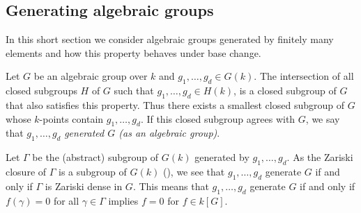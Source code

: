 \documentclass[a4paper, 11pt]{article}
\begin{document}
\subsection{Generating algebraic groups}

In this short section we consider algebraic groups generated by finitely many elements and how this property behaves under base change.

Let $G$ be an algebraic group over $k$ and $g_1,\ldots,g_d\in G(k)$. The intersection of all closed subgroups $H$ of $G$ such that $g_1,\ldots,g_d\in H(k)$, is a closed subgroup of $G$ that also satisfies this property. Thus there exists a smallest closed subgroup of $G$ whose $k$-points contain $g_1,\ldots,g_d$. If this closed subgroup agrees with $G$, we say that $g_1,\ldots,g_d$ \emph{generated $G$ (as an algebraic group)}. 

Let $\Gamma$ be the (abstract) subgroup of $G(k)$ generated by $g_1,\ldots,g_d$. As the Zariski closure of $\Gamma$ is a subgroup of $G(k)$ (\cite[Lemma 2.2.4]{Springer:LinearAlgebraicGroups}), we see that $g_1,\ldots,g_d$ generate $G$ if and only if $\Gamma$ is Zariski dense in $G$. This means that $g_1,\ldots,g_d$ generate $G$ if and only if $f(\gamma)=0$ for all $\gamma\in\Gamma$ implies $f=0$ for $f\in k[G]$.
\end{document}
